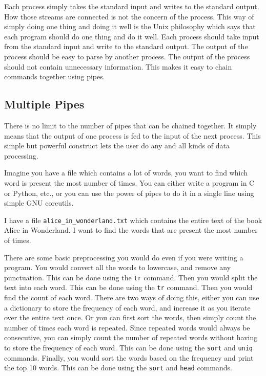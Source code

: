 Each process simply takes the standard input and writes to the standard
output. How those streams are connected is not the concern of the process.
This way of simply doing one thing and doing it well is the Unix philosophy
which says that each program should do one thing and do it well.
Each process should take input from the standard input and write to
the standard output. The output of the process should be easy to
parse by another process. The output of the process should not contain
unnecessary information. This makes it easy to chain commands together
using pipes.

\subsection{Multiple Pipes}

There is no limit to the number of pipes that can be chained together.
It simply means that the output of one process is fed to the input
of the next process. This simple but powerful construct lets the user
do any and all kinds of data processing.

Imagine you have a file which contains a lot of words, you want to
find which word is present the most number of times. You can either
write a program in C or Python, etc., or you can use the power of
pipes to do it in a single line using simple GNU coreutils.

I have a file \lstinline|alice_in_wonderland.txt| which contains the
entire text of the book Alice in Wonderland. I want to find the words
that are present the most number of times.

There are some basic preprocessing you would do even if you were writing
a program. You would convert all the words to lowercase, and remove
any punctuation. This can be done using the \lstinline|tr| command.
Then you would split the text into each word. This can be done using
the \lstinline|tr| command. Then you would find the count of each word.
There are two ways of doing this, either you can use a dictionary
to store the frequency of each word, and increase it as you iterate
over the entire text once. Or you can first sort the words, then
simply count the number of times each word is repeated. Since repeated
words would always be consecutive, you can simply count the number
of repeated words without having to store the frequency of each word.
This can be done using the \lstinline|sort| and \lstinline|uniq| commands.
Finally, you would sort the words based on the frequency and print
the top 10 words. This can be done using the \lstinline|sort| and \lstinline|head|
commands.

